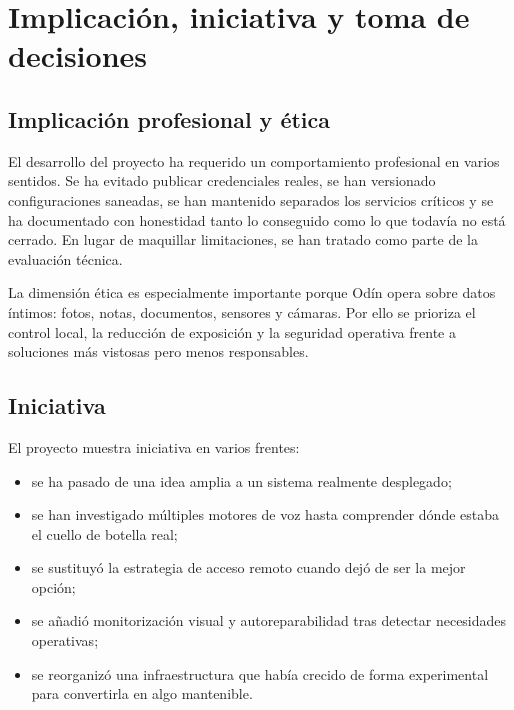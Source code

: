 \chapter{Implicación, iniciativa y toma de decisiones}

\section{Implicación profesional y ética}
El desarrollo del proyecto ha requerido un comportamiento profesional en varios sentidos. Se ha evitado publicar credenciales reales, se han versionado configuraciones saneadas, se han mantenido separados los servicios críticos y se ha documentado con honestidad tanto lo conseguido como lo que todavía no está cerrado. En lugar de maquillar limitaciones, se han tratado como parte de la evaluación técnica.

La dimensión ética es especialmente importante porque Odín opera sobre datos íntimos: fotos, notas, documentos, sensores y cámaras. Por ello se prioriza el control local, la reducción de exposición y la seguridad operativa frente a soluciones más vistosas pero menos responsables.

\section{Iniciativa}
El proyecto muestra iniciativa en varios frentes:
\begin{itemize}
  \item se ha pasado de una idea amplia a un sistema realmente desplegado;
  \item se han investigado múltiples motores de voz hasta comprender dónde estaba el cuello de botella real;
  \item se sustituyó la estrategia de acceso remoto cuando dejó de ser la mejor opción;
  \item se añadió monitorización visual y autoreparabilidad tras detectar necesidades operativas;
  \item se reorganizó una infraestructura que había crecido de forma experimental para convertirla en algo mantenible.
\end{itemize}

